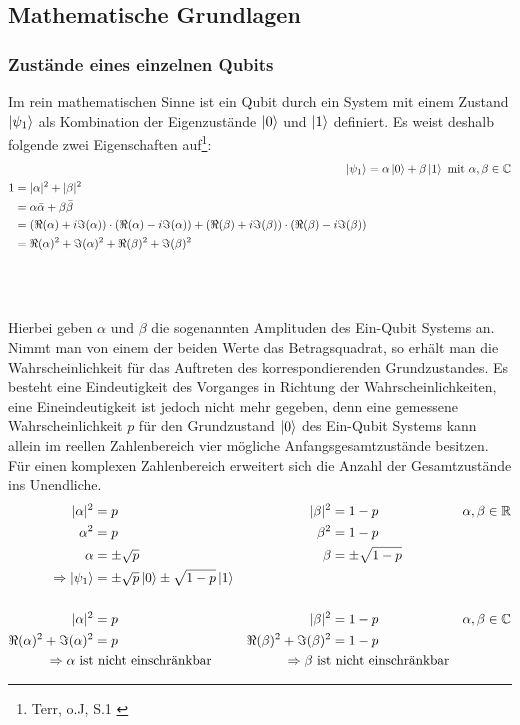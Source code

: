\documentclass[12pt]{report}
\begin{document}
	\subsection{Mathematische Grundlagen}					%
\subsubsection{Zustände eines einzelnen Qubits}			%
	Im rein mathematischen Sinne ist ein Qubit durch ein System mit einem Zustand $\ket{\psi_{1}}$ als Kombination der Eigenzustände $\ket{0}$ und $\ket{1}$ definiert. Es weist deshalb folgende zwei Eigenschaften auf\footnote{Terr, o.J, S.1 \cite{p221-1}}:
	\begin{align}
	\ket{\psi_{1}} &= \alpha\ket{0} + \beta\ket{1} \text{  mit  } \alpha,\beta \in \mathbb{C}
	\\
	\begin{split}
		1 &= \vert \alpha \vert^2 + \vert \beta \vert^2 \\
		  &= \alpha\bar{\alpha} + \beta\bar{\beta} \\
		  &= (\Re(\alpha)+i\Im(\alpha))\cdot(\Re(\alpha)-i\Im(\alpha)) + (\Re(\beta)+i\Im(\beta))\cdot(\Re(\beta)-i\Im(\beta)) \\
		  &= \Re(\alpha)^2+\Im(\alpha)^2+\Re(\beta)^2+\Im(\beta)^2
	\end{split}
	\end{align}\\
	
\newpage	
\quad \vspace{-1cm} \\ \\
Hierbei geben $\alpha$ und $\beta$ die sogenannten Amplituden des Ein-Qubit Systems an. Nimmt man von einem der beiden Werte das Betragsquadrat, so erhält man die Wahrscheinlichkeit für das Auftreten des korrespondierenden Grundzustandes. Es besteht eine Eindeutigkeit des Vorganges in Richtung der Wahrscheinlichkeiten, eine Eineindeutigkeit ist jedoch nicht mehr gegeben, denn eine gemessene Wahrscheinlichkeit $p$ für den Grundzustand $\ket{0}$ des Ein-Qubit Systems kann allein im reellen Zahlenbereich vier mögliche Anfangsgesamtzustände besitzen. Für einen komplexen Zahlenbereich erweitert sich die Anzahl der Gesamtzustände ins Unendliche. 
	\begin{align*}
	\vert \alpha \vert^2 &= p & \vert \beta \vert^2 &= 1-p & \alpha,\beta \in \mathbb{R}\\
	\alpha^2 &= p & \beta^2 &= 1-p \\
	\alpha &= \pm\sqrt{p} & \beta &= \pm\sqrt{1-p} \\
	\Rightarrow \ket{\psi_{1}} &= \pm\sqrt{p}\ket{0} \pm\sqrt{1-p}\ket{1}\\\\
	\vert \alpha \vert^2 &= p & \vert \beta \vert^2 &= 1-p & \alpha,\beta \in \mathbb{C}\\
	\Re(\alpha)^2+\Im(\alpha)^2 &= p & \Re(\beta)^2+\Im(\beta)^2 &= 1-p\\
	\Rightarrow \alpha \text{ ist}&\text{ nicht einschränkbar} & \Rightarrow \beta \text{ ist}&\text{ nicht einschränkbar}
	\end{align*}
	
\end{document}
